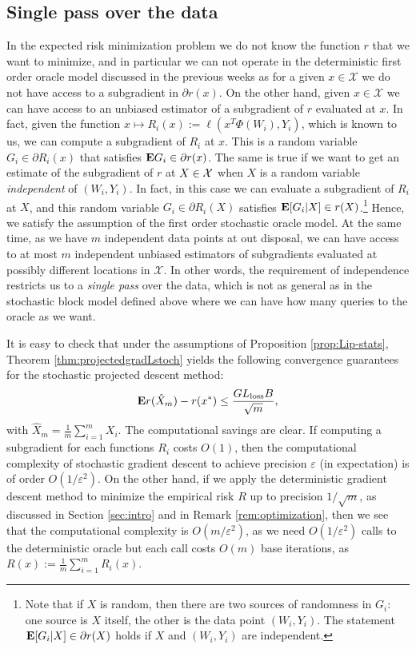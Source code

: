 \subsection{Single pass over the data}
In the expected risk minimization problem we do not know the function $r$ that we want to minimize, and in particular we can not operate in the deterministic first order oracle model discussed in the previous weeks as for a given $x\in\mathcal{X}$ we do not have access to a subgradient in $\partial r(x)$. On the other hand, given $x\in\mathcal{X}$ we can have access to an unbiased estimator of a subgradient of $r$ evaluated at $x$. In fact, given the function $x \mapsto R_i(x) := \ell(x^T\Phi(W_i),Y_i)$, which is known to us, we can compute a subgradient of $R_i$ at $x$. This is a random variable $G_i\in \partial R_i(x)$ that satisfies $\mathbf{E} G_i \in \partial r(x)$. The same is true if we want to get an estimate of the subgradient of $r$ at $X\in\mathcal{X}$ when $X$ is a random variable \emph{independent} of $(W_i,Y_i)$. In fact, in this case we can evaluate a subgradient of $R_i$ at $X$, and this random variable $G_i\in \partial R_i(X)$ satisfies $\mathbf{E}[G_i|X]\in r(X)$.\footnote{Note that if $X$ is random, then there are two sources of randomness in $G_i$: one source is $X$ itself, the other is the data point $(W_i,Y_i)$. The statement $\mathbf{E}[G_i|X]\in \partial r(X)$ holds if $X$ and $(W_i,Y_i)$ are independent.} Hence, we satisfy the assumption of the first order stochastic oracle model. At the same time, as we have $m$ independent data points at out disposal, we can have access to at most $m$ independent unbiased estimators of subgradients evaluated at possibly different locations in $\mathcal{X}$. In other words, the requirement of independence restricts us to a \emph{single pass} over the data, which is not as general as in the stochastic block model defined above where we can have how many queries to the oracle as we want.

It is easy to check that under the assumptions of Proposition \ref{prop:Lip-stats}, Theorem \ref{thm:projectedgradLstoch} yields the following convergence guarantees for the stochastic projected descent method:
$$
	\mathbf{E} r(\hat X_m) - r(x^*) \leq \frac{GL_\textrm{loss}B}{\sqrt{m}},
$$
with $\hat X_m = \frac{1}{m}\sum_{i=1}^m X_i$. The computational savings are clear. If computing a subgradient for each functions $R_i$ costs $O(1)$, then the computational complexity of stochastic gradient descent to achieve precision $\varepsilon$ (in expectation) is of order $O(1/\varepsilon^2)$. On the other hand, if we apply the deterministic gradient descent method to minimize the empirical risk $R$ up to precision $1/\sqrt{m}$, as discussed in Section \ref{sec:intro} and in Remark \ref{rem:optimization}, then we see that the computational complexity is $O(m/\varepsilon^2)$, as we need $O(1/\varepsilon^2)$ calls to the deterministic oracle but each call costs $O(m)$ base iterations, as $R(x) := \frac{1}{m} \sum_{i=1}^m R_i(x)$.

